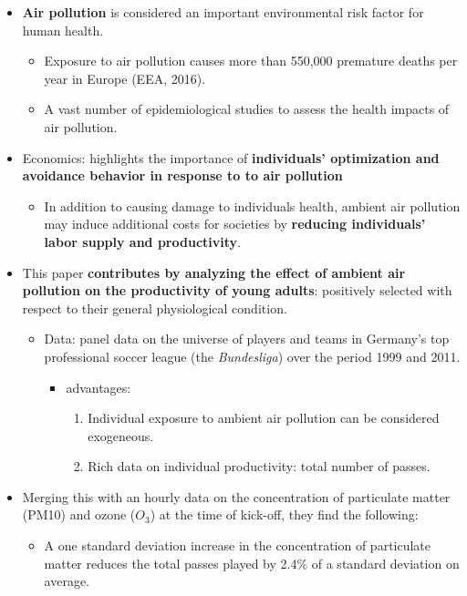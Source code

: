 \documentclass[../root]{subfiles}
\begin{document}
    \begin{itemize}
      \item \textbf{Air pollution} is considered an important environmental risk factor for human health.
      \begin{itemize}
        \item Exposure to air pollution causes more than 550,000 premature deaths per year in Europe (EEA, 2016).
        \item A vast number of epidemiological studies to assess the health impacts of air pollution.
      \end{itemize}
      \item Economics: highlights the importance of \textbf{individuals' optimization and avoidance behavior in response to to air pollution}
      \begin{itemize}
        \item In addition to causing damage to individuals health, ambient air pollution may induce additional costs for societies by \textbf{reducing individuals' labor supply and productivity}.
      \end{itemize}
      \item This paper \textbf{contributes by analyzing the effect of ambient air pollution on the productivity of young adults}: positively selected with respect to their general physiological condition.
      \begin{itemize}
        \item Data: panel data on the universe of players and teams in Germany's top professional soccer league (the \textit{Bundesliga}) over the period 1999 and 2011.
        \begin{itemize}
          \item advantages:
          \begin{enumerate}
            \item Individual exposure to ambient air pollution can be considered exogeneous.
            \item Rich data on individual productivity: total number of passes.
          \end{enumerate}
        \end{itemize}
      \end{itemize}
      \item Merging this with an hourly data on the concentration of particulate matter (PM10) and ozone ($O_3$) at the time of kick-off, they find the following:
      \begin{itemize}
        \item A one standard deviation increase in the concentration of particulate matter reduces the total passes played by 2.4\% of a standard deviation on average.

\end{itemize}
\end{itemize}
\end{document}
